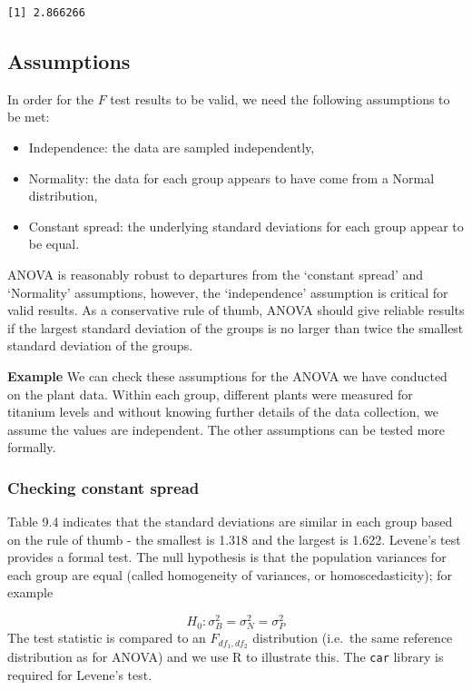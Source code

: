 \documentclass[
  oneside]{krantz}
\providecommand{\tightlist}{%
  \setlength{\itemsep}{0pt}\setlength{\parskip}{0pt}}
\begin{document}
\begin{verbatim}
[1] 2.866266
\end{verbatim}

\hypertarget{assumptions}{%
\subsection{Assumptions}\label{assumptions}}

In order for the \(F\) test results to be valid, we need the following assumptions to be met:

\begin{itemize}
\tightlist
\item
  Independence: the data are sampled independently,
\item
  Normality: the data for each group appears to have come from a Normal distribution,
\item
  Constant spread: the underlying standard deviations for each group appear to be equal.
\end{itemize}

ANOVA is reasonably robust to departures from the `constant spread' and `Normality' assumptions, however, the `independence' assumption is critical for valid results. As a conservative rule of thumb, ANOVA should give reliable results if the largest standard deviation of the groups is no larger than twice the smallest standard deviation of the groups.

\textbf{Example} We can check these assumptions for the ANOVA we have conducted on the plant data. Within each group, different plants were measured for titanium levels and without knowing further details of the data collection, we assume the values are independent. The other assumptions can be tested more formally.

\hypertarget{checking-constant-spread}{%
\subsubsection{Checking constant spread}\label{checking-constant-spread}}

Table 9.4 indicates that the standard deviations are similar in each group based on the rule of thumb - the smallest is 1.318 and the largest is 1.622. Levene's test provides a formal test. The null hypothesis is that the population variances for each group are equal (called homogeneity of variances, or homoscedasticity); for example

\[H_0: \sigma_B^2 = \sigma_N^2 = \sigma_P^2 \]
The test statistic is compared to an \(F_{df_1,df_2}\) distribution (i.e.~the same reference distribution as for ANOVA) and we use R to illustrate this. The \texttt{car} \citep{Fox2019} library is required for Levene's test.
\end{document}
